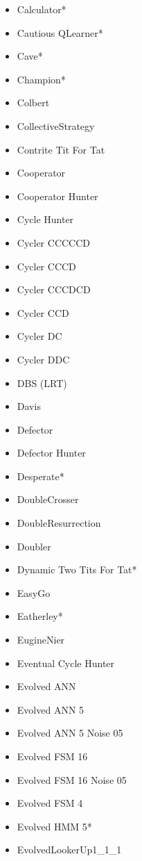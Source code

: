 \begin{appendices}
\begin{multicols}{4}
\begin{itemize}
            \item Calculator*
            \item Cautious QLearner*
            \item Cave*
            \item Champion*
            \item Colbert
            \item CollectiveStrategy
            \item Contrite Tit For Tat
            \item Cooperator
            \item Cooperator Hunter
            \item Cycle Hunter
            \item Cycler CCCCCD
            \item Cycler CCCD
            \item Cycler CCCDCD
            \item Cycler CCD
            \item Cycler DC
            \item Cycler DDC
            \item DBS (LRT) 
            \item Davis
            \item Defector
            \item Defector Hunter
            \item Desperate*
            \item DoubleCrosser
            \item DoubleResurrection
            \item Doubler
            \item Dynamic Two Tits For Tat*
            \item EasyGo
            \item Eatherley*
            \item EugineNier
            \item Eventual Cycle Hunter
            \item Evolved ANN
            \item Evolved ANN 5
            \item Evolved ANN 5 Noise 05
            \item Evolved FSM 16
            \item Evolved FSM 16 Noise 05
            \item Evolved FSM 4
            \item Evolved HMM 5*
            \item EvolvedLookerUp1\_1\_1

\end{itemize}
\end{multicols}
\end{appendices}
